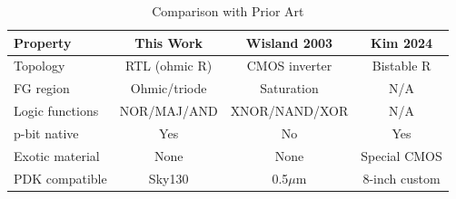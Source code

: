 \begin{table}[h]
\centering
\caption{Comparison with Prior Art}
\begin{tabular}{lccc}
\hline
Property & This Work & Wisland 2003 & Kim 2024 \\
\hline
Topology & RTL (ohmic R) & CMOS inverter & Bistable R \\
FG region & Ohmic/triode & Saturation & N/A \\
Logic functions & NOR/MAJ/AND & XNOR/NAND/XOR & N/A \\
p-bit native & Yes & No & Yes \\
Exotic material & None & None & Special CMOS \\
PDK compatible & Sky130 & 0.5$\mu$m & 8-inch custom \\
\hline
\end{tabular}
\end{table}
